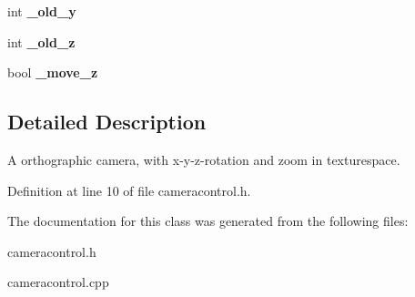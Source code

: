 \begin{DoxyCompactItemize}
\item 
int {\bfseries \-\_\-old\-\_\-y}\label{classSoundfieldViewer_1_1CameraControl_a9f3291ad823cf1e9ae08fc14387c0c1f}

\item 
int {\bfseries \-\_\-old\-\_\-z}\label{classSoundfieldViewer_1_1CameraControl_aac0a3589eca408aa49f4414ebd3dc15b}

\item 
bool {\bfseries \-\_\-move\-\_\-z}\label{classSoundfieldViewer_1_1CameraControl_a2125e4947be904c5898560be20e174af}

\end{DoxyCompactItemize}


\subsection{Detailed Description}
A orthographic camera, with x-\/y-\/z-\/rotation and zoom in texturespace. 

Definition at line 10 of file cameracontrol.\-h.



The documentation for this class was generated from the following files\-:\begin{DoxyCompactItemize}
\item 
cameracontrol.\-h\item 
cameracontrol.\-cpp\end{DoxyCompactItemize}
